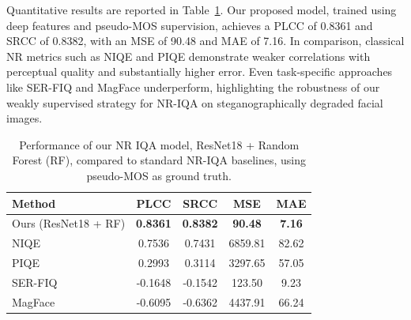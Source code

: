 Quantitative results are reported in Table~\ref{tab:nr_scores}. Our proposed model, trained using deep features and pseudo-MOS supervision, achieves a PLCC of 0.8361 and SRCC of 0.8382, with an MSE of 90.48 and MAE of 7.16. In comparison, classical NR metrics such as NIQE and PIQE demonstrate weaker correlations with perceptual quality and substantially higher error. Even task-specific approaches like SER-FIQ and MagFace underperform, highlighting the robustness of our weakly supervised strategy for NR-IQA on steganographically degraded facial images.

\begin{table}
\caption{Performance of our NR IQA model, ResNet18 + Random Forest (RF), compared to standard NR-IQA baselines, using pseudo-MOS as ground truth.}
\begin{center}
\begin{tabular}{lcccc}
\toprule
\textbf{Method} & \textbf{PLCC} & \textbf{SRCC} & \textbf{MSE} & \textbf{MAE} \\
\midrule
Ours (ResNet18 + RF) & \textbf{0.8361} & \textbf{0.8382} & \textbf{90.48} & \textbf{7.16} \\
NIQE                 & 0.7536          & 0.7431          & 6859.81        & 82.62 \\
PIQE                 & 0.2993          & 0.3114          & 3297.65        & 57.05 \\
SER-FIQ              & -0.1648         & -0.1542         & 123.50         & 9.23 \\
MagFace              & -0.6095         & -0.6362         & 4437.91        & 66.24 \\
\bottomrule
\end{tabular}\label{tab:nr_scores}
\end{center}
\end{table}

